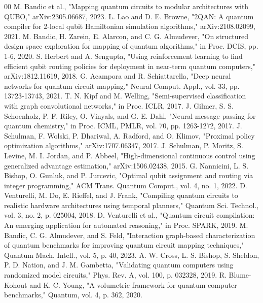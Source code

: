 \documentclass[conference]{IEEEtran}
\begin{document}
\begin{thebibliography}{00}
 M. Bandic et al., "Mapping quantum circuits to modular architectures with QUBO," arXiv:2305.06687, 2023.
 L. Lao and D. E. Browne, "2QAN: A quantum compiler for 2-local qubit Hamiltonian simulation algorithms," arXiv:2108.02099, 2021.
 M. Bandic, H. Zarein, E. Alarcon, and C. G. Almudever, "On structured design space exploration for mapping of quantum algorithms," in Proc. DCIS, pp. 1-6, 2020.
 S. Herbert and A. Sengupta, "Using reinforcement learning to find efficient qubit routing policies for deployment in near-term quantum computers," arXiv:1812.11619, 2018.
 G. Acampora and R. Schiattarella, "Deep neural networks for quantum circuit mapping," Neural Comput. Appl., vol. 33, pp. 13723-13743, 2021.
 T. N. Kipf and M. Welling, "Semi-supervised classification with graph convolutional networks," in Proc. ICLR, 2017.
 J. Gilmer, S. S. Schoenholz, P. F. Riley, O. Vinyals, and G. E. Dahl, "Neural message passing for quantum chemistry," in Proc. ICML, PMLR, vol. 70, pp. 1263-1272, 2017.
 J. Schulman, F. Wolski, P. Dhariwal, A. Radford, and O. Klimov, "Proximal policy optimization algorithms," arXiv:1707.06347, 2017.
 J. Schulman, P. Moritz, S. Levine, M. I. Jordan, and P. Abbeel, "High-dimensional continuous control using generalized advantage estimation," arXiv:1506.02438, 2015.
 G. Nannicini, L. S. Bishop, O. Gunluk, and P. Jurcevic, "Optimal qubit assignment and routing via integer programming," ACM Trans. Quantum Comput., vol. 4, no. 1, 2022.
 D. Venturelli, M. Do, E. Rieffel, and J. Frank, "Compiling quantum circuits to realistic hardware architectures using temporal planners," Quantum Sci. Technol., vol. 3, no. 2, p. 025004, 2018.
 D. Venturelli et al., "Quantum circuit compilation: An emerging application for automated reasoning," in Proc. SPARK, 2019.
 M. Bandic, C. G. Almudever, and S. Feld, "Interaction graph-based characterization of quantum benchmarks for improving quantum circuit mapping techniques," Quantum Mach. Intell., vol. 5, p. 40, 2023.
 A. W. Cross, L. S. Bishop, S. Sheldon, P. D. Nation, and J. M. Gambetta, "Validating quantum computers using randomized model circuits," Phys. Rev. A, vol. 100, p. 032328, 2019.
 R. Blume-Kohout and K. C. Young, "A volumetric framework for quantum computer benchmarks," Quantum, vol. 4, p. 362, 2020.

\end{thebibliography}
\end{document}
